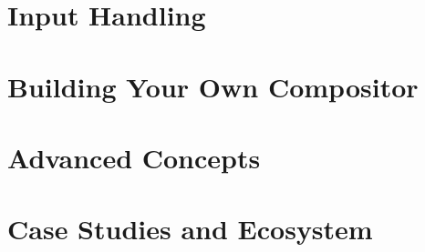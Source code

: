 \documentclass[11pt,twoside,openright]{book}
\theoremstyle{definition}
\begin{document}
\part{Input Handling}
\label{part:input}





\part{Building Your Own Compositor}
\label{part:implementation}







\part{Advanced Concepts}
\label{part:advanced}






\part{Case Studies and Ecosystem}
\label{part:case-studies}




\backmatter
\appendix





\printglossary[type=\acronymtype,title=Acronyms]
\printglossary[title=Glossary]

\printbibliography[heading=bibintoc,title={References}]

\printindex
\end{document}
